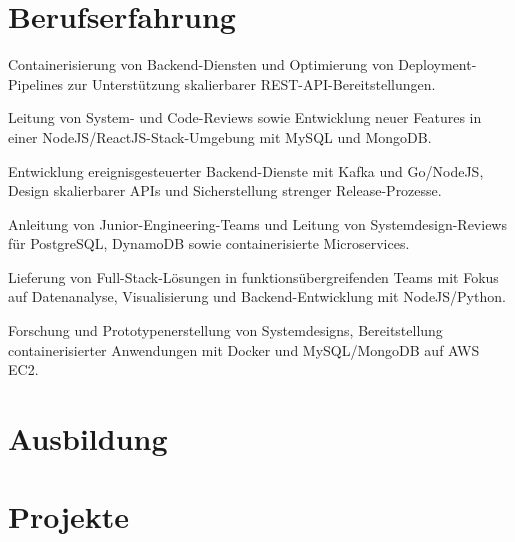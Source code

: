 \documentclass[11pt,a4paper]{resume}
\begin{document}
\section{Berufserfahrung}

\bullets
  \item Containerisierung von Backend-Diensten und Optimierung von Deployment-Pipelines zur Unterstützung skalierbarer REST-API-Bereitstellungen.
  \item Leitung von System- und Code-Reviews sowie Entwicklung neuer Features in einer NodeJS/ReactJS-Stack-Umgebung mit MySQL und MongoDB.
\bulletsend
\vspace{3pt}
\bullets
  \item Entwicklung ereignisgesteuerter Backend-Dienste mit Kafka und Go/NodeJS, Design skalierbarer APIs und Sicherstellung strenger Release-Prozesse.
  \item Anleitung von Junior-Engineering-Teams und Leitung von Systemdesign-Reviews für PostgreSQL, DynamoDB sowie containerisierte Microservices.
\bulletsend
\vspace{3pt}
\bullets
  \item Lieferung von Full-Stack-Lösungen in funktionsübergreifenden Teams mit Fokus auf Datenanalyse, Visualisierung und Backend-Entwicklung mit NodeJS/Python.
  \item Forschung und Prototypenerstellung von Systemdesigns, Bereitstellung containerisierter Anwendungen mit Docker und MySQL/MongoDB auf AWS EC2.
\bulletsend
\vspace{3pt}

\section{Ausbildung}

\vspace{2pt}

\section{Projekte}
\end{document}
